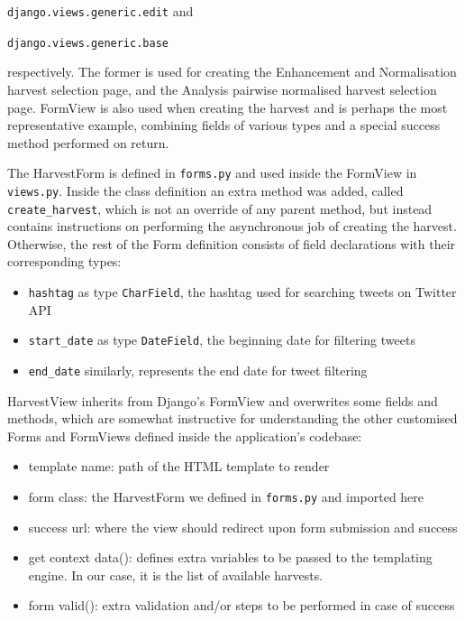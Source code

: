 \texttt{django.views.generic.edit} and 

\texttt{django.views.generic.base}

respectively. The former is used for creating the Enhancement and Normalisation harvest selection page, and the Analysis pairwise normalised harvest selection page. FormView is also used when creating the harvest and is perhaps the most representative example, combining fields of various types and a special success method performed on return.

The HarvestForm is defined in \texttt{forms.py} and used inside the FormView in \texttt{views.py}. Inside the class definition an extra method was added, called \texttt{create\_harvest}, which is not an override of any parent method, but instead contains instructions on performing the asynchronous job of creating the harvest. Otherwise, the rest of the Form definition consists of field declarations with their corresponding types:

\begin{itemize}
\item \texttt{hashtag} as type \texttt{CharField}, the hashtag used for searching tweets on Twitter API
\item \texttt{start\_date} as type \texttt{DateField}, the beginning date for filtering tweets
\item \texttt{end\_date} similarly, represents the end date for tweet filtering
\end{itemize}

HarvestView inherits from Django's FormView and overwrites some fields and methods, which are somewhat instructive for understanding the other customised Forms and FormViews defined inside the application's codebase:

\begin{itemize}
\item template name: path of the HTML template to render
\item form class: the HarvestForm we defined in \texttt{forms.py} and imported here
\item success url: where the view should redirect upon form submission and success
\item get context data(): defines extra variables to be passed to the templating engine. In our case, it is the list of available harvests.
\item form valid(): extra validation and/or steps to be performed in case of success
\end{itemize}

